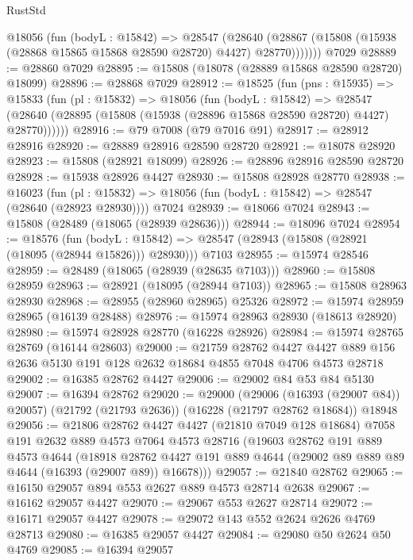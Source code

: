 \begin{lexlean}{RustStd}
\begin{coremodule}
        @18056
          (fun (bodyL : @15842) =>
          @28547
            (@28640
              (@28867 (@15808 (@15938 (@28868 @15865 @15868 @28590 @28720) @4427) @28770)))))))
    @7029
@28889 := @28860 @7029
@28895 := @15808 (@18078 (@28889 @15868 @28590 @28720) @18099)
@28896 := @28868 @7029
@28912 := @18525
    (fun (pns : @15935) =>
    @15833
      (fun (pl : @15832) =>
      @18056
        (fun (bodyL : @15842) =>
        @28547 (@28640 (@28895 (@15808 (@15938 (@28896 @15868 @28590 @28720) @4427) @28770))))))
@28916 := @79 @7008 (@79 @7016 @91)
@28917 := @28912 @28916
@28920 := @28889 @28916 @28590 @28720
@28921 := @18078 @28920
@28923 := @15808 (@28921 @18099)
@28926 := @28896 @28916 @28590 @28720
@28928 := @15938 @28926 @4427
@28930 := @15808 @28928 @28770
@28938 := @16023
    (fun (pl : @15832) => @18056 (fun (bodyL : @15842) => @28547 (@28640 (@28923 @28930))))
    @7024
@28939 := @18066 @7024
@28943 := @15808 (@28489 (@18065 (@28939 @28636)))
@28944 := @18096 @7024
@28954 := @18576
    (fun (bodyL : @15842) => @28547 (@28943 (@15808 (@28921 (@18095 (@28944 @15826))) @28930)))
    @7103
@28955 := @15974 @28546
@28959 := @28489 (@18065 (@28939 (@28635 @7103)))
@28960 := @15808 @28959
@28963 := @28921 (@18095 (@28944 @7103))
@28965 := @15808 @28963 @28930
@28968 := @28955 (@28960 @28965) @25326
@28972 := @15974 @28959 @28965 (@16139 @28488)
@28976 := @15974 @28963 @28930 (@18613 @28920)
@28980 := @15974 @28928 @28770 (@16228 @28926)
@28984 := @15974 @28765 @28769 (@16144 @28603)
@29000 := @21759
    @28762
    @4427
    @4427
    @889
    @156
    @2636
    @5130
    @191
    @128
    @2632
    @18684
    @4855
    @7048
    @4706
    @4573
    @28718
@29002 := @16385 @28762 @4427
@29006 := @29002 @84 @53 @84 @5130
@29007 := @16394 @28762
@29020 := @29000
    (@29006 (@16393 (@29007 @84)) @20057)
    (@21792 (@21793 @2636))
    (@16228 (@21797 @28762 @18684))
    @18948
@29056 := @21806
    @28762
    @4427
    @4427
    (@21810 @7049 @128 @18684)
    @7058
    @191
    @2632
    @889
    @4573
    @7064
    @4573
    @28716
    (@19603
      @28762
      @191
      @889
      @4573
      @4644
      (@18918
        @28762
        @4427
        @191
        @889
        @4644
        (@29002 @89 @889 @89 @4644 (@16393 (@29007 @89)) @16678)))
@29057 := @21840 @28762
@29065 := @16150 @29057 @894 @553 @2627 @889 @4573 @28714 @2638
@29067 := @16162 @29057 @4427
@29070 := @29067 @553 @2627 @28714
@29072 := @16171 @29057 @4427
@29078 := @29072 @143 @552 @2624 @2626 @4769 @28713
@29080 := @16385 @29057 @4427
@29084 := @29080 @50 @2624 @50 @4769
@29085 := @16394 @29057

\end{coremodule}
\end{lexlean}
